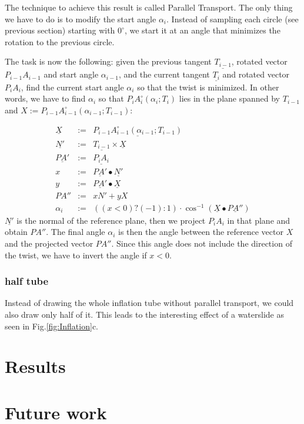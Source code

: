 \documentclass[journal, letterpaper]{IEEEtran}
\begin{document}
The technique to achieve this result is called Parallel Transport. The only thing we have to do is to modify the start angle $\alpha_i$. Instead of sampling each circle (see previous section) starting with $0^{\circ}$, we start it at an angle that minimizes the rotation to the previous circle.

The task is now the following: given the previous tangent $\underline{T_{i-1}}$, rotated vector $P_{i-1}A_{i-1}$ and start angle $\alpha_{i-1}$, and the current tangent $\underline{T_i}$ and rotated vector $P_i A_i$, find the current start angle $\alpha_i$ so that the twist is minimized.
In other words, we have to find $\alpha_i$ so that $P_i A_i^{\circ}(\alpha_i; T_i)$ lies in the plane spanned by $T_{i-1}$ and $X:=P_{i-1}A_{i-1}^{\circ}(\alpha_{i-1}; T_{i-1})$:

\begin{equation}
	\begin{array}{rcl}
		\underline{X} &:=& \underline{P_{i-1}A_{i-1}^{\circ}(\alpha_{i-1}; T_{i-1})} \\
		\underline{N'} &:=& \underline{T_{i-1}} \times \underline{X} \\
		\underline{PA'} &:=& \underline{P_i A_i} \\
		x &:=& \underline{PA'} \bullet \underline{N'} \\
		y &:=& \underline{PA'} \bullet \underline{X} \\
		PA'' &:=& xN' + yX \\
		\alpha_i &:=& ( (x<0)?(-1):1 ) \cdot \cos^{-1}(\underline{X} \bullet \underline{PA''})
	\end{array}
\label{eq:ParallelTransport}
\end{equation}
$\underline{N'}$ is the normal of the reference plane, then we project $P_i A_i$ in that plane and obtain $PA''$. The final angle $\alpha_i$ is then the angle between the reference vector $X$ and the projected vector $PA''$. Since this angle does not include the direction of the twist, we have to invert the angle if $x<0$.

\subsubsection{half tube}
Instead of drawing the whole inflation tube without parallel transport, we could also draw only half of it. This leads to the interesting effect of a waterslide as seen in Fig.\ref{fig:Inflation}c.

\section{Results}

\section{Future work}
\end{document}
